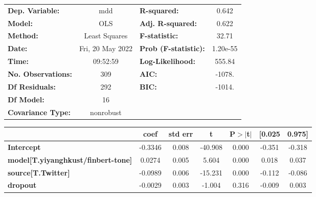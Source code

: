 \begin{center}
\begin{tabular}{lclc}
\toprule
\textbf{Dep. Variable:}                    &       mdd        & \textbf{  R-squared:         } &     0.642   \\
\textbf{Model:}                            &       OLS        & \textbf{  Adj. R-squared:    } &     0.622   \\
\textbf{Method:}                           &  Least Squares   & \textbf{  F-statistic:       } &     32.71   \\
\textbf{Date:}                             & Fri, 20 May 2022 & \textbf{  Prob (F-statistic):} &  1.20e-55   \\
\textbf{Time:}                             &     09:52:59     & \textbf{  Log-Likelihood:    } &    555.84   \\
\textbf{No. Observations:}                 &         309      & \textbf{  AIC:               } &    -1078.   \\
\textbf{Df Residuals:}                     &         292      & \textbf{  BIC:               } &    -1014.   \\
\textbf{Df Model:}                         &          16      & \textbf{                     } &             \\
\textbf{Covariance Type:}                  &    nonrobust     & \textbf{                     } &             \\
\bottomrule
\end{tabular}
\begin{tabular}{lcccccc}
                                           & \textbf{coef} & \textbf{std err} & \textbf{t} & \textbf{P$> |$t$|$} & \textbf{[0.025} & \textbf{0.975]}  \\
\midrule
\textbf{Intercept}                         &      -0.3346  &        0.008     &   -40.908  &         0.000        &       -0.351    &       -0.318     \\
\textbf{model[T.yiyanghkust/finbert-tone]} &       0.0274  &        0.005     &     5.604  &         0.000        &        0.018    &        0.037     \\
\textbf{source[T.Twitter]}                 &      -0.0989  &        0.006     &   -15.231  &         0.000        &       -0.112    &       -0.086     \\
\textbf{dropout}                           &      -0.0029  &        0.003     &    -1.004  &         0.316        &       -0.009    &        0.003     \\

\end{tabular}
\end{center}
